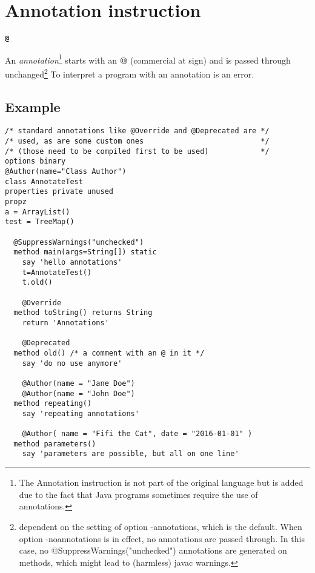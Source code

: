 \chapter{Annotation instruction}\label{refparse}
\begin{shaded}
\begin{alltt}
\textbf{@}
\end{alltt}
\end{shaded}
An \emph{annotation}\footnote{The Annotation instruction is not part of
the original \nr{} language but is added due to the fact that Java
programs sometimes require the use of annotations.} starts with an \textbf{@} (commercial at sign)
and is passed through unchanged\footnote{dependent on the setting of
option -annotations, which is the default. When option -noannotations
is in effect, no annotations are passed through. In this case, no
@SuppressWarnings("unchecked") annotations are generated on methods,
which might lead to (harmless) javac warnings. } To interpret a program with an annotation is an error.
\section{Example}
\begin{lstlisting}
/* standard annotations like @Override and @Deprecated are */
/* used, as are some custom ones                           */
/* (those need to be compiled first to be used)            */
options binary
@Author(name="Class Author")
class AnnotateTest
properties private unused
propz
a = ArrayList()
test = TreeMap()

  @SuppressWarnings("unchecked")
  method main(args=String[]) static
    say 'hello annotations'
    t=AnnotateTest()
    t.old()

    @Override
  method toString() returns String
    return 'Annotations'

    @Deprecated
  method old() /* a comment with an @ in it */
    say 'do no use anymore'

    @Author(name = "Jane Doe")
    @Author(name = "John Doe")
  method repeating()
    say 'repeating annotations'

    @Author( name = "Fifi the Cat", date = "2016-01-01" )
  method parameters()
    say 'parameters are possible, but all on one line'
\end{lstlisting}
